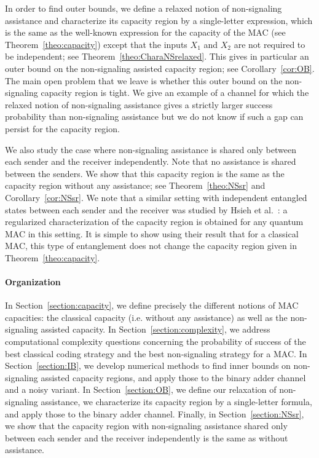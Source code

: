 \documentclass[11pt]{article}
\theoremstyle{definition}
\theoremstyle{remark}
\begin{document}
In order to find outer bounds, we define a relaxed notion of non-signaling assistance and characterize its capacity region by a single-letter expression, which is the same as the well-known expression for the capacity of the MAC (see Theorem~\ref{theo:capacity}) except that the inputs $X_1$ and $X_2$ are not required to be independent; see Theorem~\ref{theo:CharaNSrelaxed}. This gives in particular an outer bound on the non-signaling assisted capacity region; see Corollary~\ref{cor:OB}. The main open problem that we leave is whether this outer bound on the non-signaling capacity region is tight. We give an example of a channel for which the relaxed notion of non-signaling assistance gives a strictly larger success probability than non-signaling assistance but we do not know if such a gap can persist for the capacity region.

We also study the case where non-signaling assistance is shared only between each sender and the receiver independently. Note that no assistance is shared between the senders. We show that this capacity region is the same as the capacity region without any assistance; see Theorem~\ref{theo:NSsr} and Corollary~\ref{cor:NSsr}. We note that a similar setting with independent entangled states between each sender and the receiver was studied by Hsieh et al.~\cite{HDW08}: a regularized characterization of the capacity region is obtained for any quantum MAC in this setting. It is simple to show using their result that for a classical MAC, this type of entanglement does not change the capacity region given in Theorem~\ref{theo:capacity}.

\paragraph{Organization} In Section~\ref{section:capacity}, we define precisely the different notions of MAC capacities: the classical capacity (i.e. without any assistance) as well as the non-signaling assisted capacity. In Section~\ref{section:complexity}, we address computational complexity questions concerning the probability of success of the best classical coding strategy and the best non-signaling strategy for a MAC. In Section~\ref{section:IB}, we develop numerical methods to find inner bounds on non-signaling assisted capacity regions, and apply those to the binary adder channel and a noisy variant. In Section~\ref{section:OB}, we define our relaxation of non-signaling assistance, we characterize its capacity region by a single-letter formula, and apply those to the binary adder channel. Finally, in Section~\ref{section:NSsr}, we show that the capacity region with non-signaling assistance shared only between each sender and the receiver independently is the same as without assistance.
\end{document}
